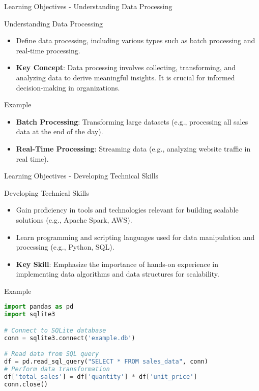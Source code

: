 \documentclass[aspectratio=169]{beamer}
\begin{document}
\begin{frame}[fragile]{Learning Objectives - Understanding Data Processing}
    \begin{block}{Understanding Data Processing}
        \begin{itemize}
            \item Define data processing, including various types such as batch processing and real-time processing.
            \item \textbf{Key Concept}: Data processing involves collecting, transforming, and analyzing data to derive meaningful insights. It is crucial for informed decision-making in organizations.
        \end{itemize}
    \end{block}

    \begin{block}{Example}
        \begin{itemize}
            \item \textbf{Batch Processing}: Transforming large datasets (e.g., processing all sales data at the end of the day).
            \item \textbf{Real-Time Processing}: Streaming data (e.g., analyzing website traffic in real time).
        \end{itemize}
    \end{block}
\end{frame}

\begin{frame}[fragile]{Learning Objectives - Developing Technical Skills}
    \begin{block}{Developing Technical Skills}
        \begin{itemize}
            \item Gain proficiency in tools and technologies relevant for building scalable solutions (e.g., Apache Spark, AWS).
            \item Learn programming and scripting languages used for data manipulation and processing (e.g., Python, SQL).
            \item \textbf{Key Skill}: Emphasize the importance of hands-on experience in implementing data algorithms and data structures for scalability.
        \end{itemize}
    \end{block}

    \begin{block}{Example}
        \begin{lstlisting}[language=Python]
import pandas as pd
import sqlite3

# Connect to SQLite database
conn = sqlite3.connect('example.db')

# Read data from SQL query
df = pd.read_sql_query("SELECT * FROM sales_data", conn)
# Perform data transformation
df['total_sales'] = df['quantity'] * df['unit_price']
conn.close()
        \end{lstlisting}
    \end{block}
\end{frame}
\end{document}
